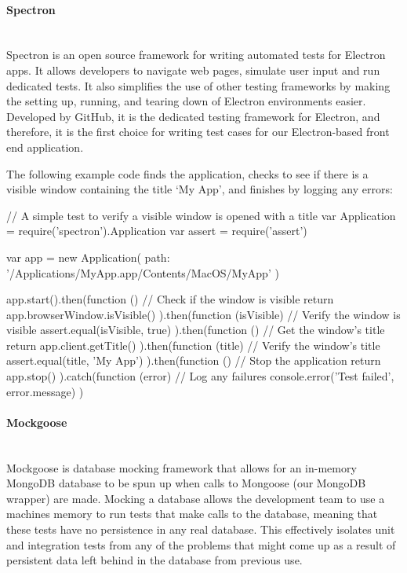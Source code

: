 \paragraph{Spectron} \mbox{}\\[\paragraphheaderspace]
Spectron is an open source framework for writing automated tests for Electron apps. It allows developers to navigate web pages, simulate user input and run dedicated tests. It also simplifies the use of other testing frameworks by making the setting up, running, and tearing down of Electron environments easier. Developed by GitHub, it is the dedicated testing framework for Electron, and therefore, it is the first choice for writing test cases for our Electron-based front end application.\par
The following example code finds the application, checks to see if there is a visible window containing the title \lq My App\rq, and finishes by logging any errors:

\begin{javascriptcode}
// A simple test to verify a visible window is opened with a title
var Application = require('spectron').Application
var assert = require('assert')

var app = new Application({
  path: '/Applications/MyApp.app/Contents/MacOS/MyApp'
})

app.start().then(function () {
  // Check if the window is visible
  return app.browserWindow.isVisible()
}).then(function (isVisible) {
  // Verify the window is visible
  assert.equal(isVisible, true)
}).then(function () {
  // Get the window's title
  return app.client.getTitle()
}).then(function (title) {
  // Verify the window's title
  assert.equal(title, 'My App')
}).then(function () {
  // Stop the application
  return app.stop()
}).catch(function (error) {
  // Log any failures
  console.error('Test failed', error.message)
})
\end{javascriptcode}

\paragraph{Mockgoose} \mbox{}\\[\paragraphheaderspace]
Mockgoose is database mocking framework that allows for an in-memory MongoDB database to be spun up when calls to Mongoose (our MongoDB wrapper) are made. Mocking a database allows the development team to use a machine\textquotesingle s memory to run tests that make calls to the database, meaning that these tests have no persistence in any real database. This effectively isolates unit and integration tests from any of the problems that might come up as a result of persistent data left behind in the database from previous use.

